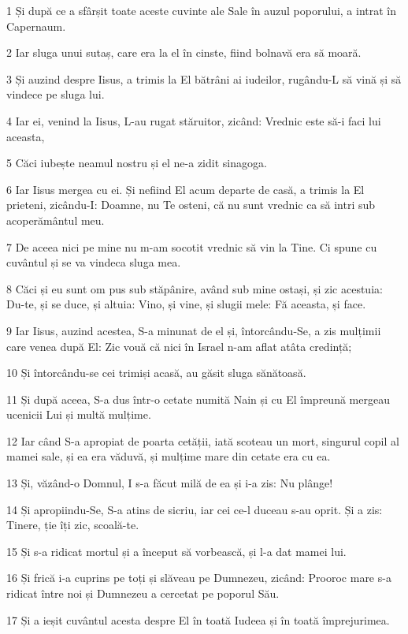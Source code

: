 \par 1 Și după ce a sfârșit toate aceste cuvinte ale Sale în auzul poporului, a intrat în Capernaum.
\par 2 Iar sluga unui sutaș, care era la el în cinste, fiind bolnavă era să moară.
\par 3 Și auzind despre Iisus, a trimis la El bătrâni ai iudeilor, rugându-L să vină și să vindece pe sluga lui.
\par 4 Iar ei, venind la Iisus, L-au rugat stăruitor, zicând: Vrednic este să-i faci lui aceasta,
\par 5 Căci iubește neamul nostru și el ne-a zidit sinagoga.
\par 6 Iar Iisus mergea cu ei. Și nefiind El acum departe de casă, a trimis la El prieteni, zicându-I: Doamne, nu Te osteni, că nu sunt vrednic ca să intri sub acoperământul meu.
\par 7 De aceea nici pe mine nu m-am socotit vrednic să vin la Tine. Ci spune cu cuvântul și se va vindeca sluga mea.
\par 8 Căci și eu sunt om pus sub stăpânire, având sub mine ostași, și zic acestuia: Du-te, și se duce, și altuia: Vino, și vine, și slugii mele: Fă aceasta, și face.
\par 9 Iar Iisus, auzind acestea, S-a minunat de el și, întorcându-Se, a zis mulțimii care venea după El: Zic vouă că nici în Israel n-am aflat atâta credință;
\par 10 Și întorcându-se cei trimiși acasă, au găsit sluga sănătoasă.
\par 11 Și după aceea, S-a dus într-o cetate numită Nain și cu El împreună mergeau ucenicii Lui și multă mulțime.
\par 12 Iar când S-a apropiat de poarta cetății, iată scoteau un mort, singurul copil al mamei sale, și ea era văduvă, și mulțime mare din cetate era cu ea.
\par 13 Și, văzând-o Domnul, I s-a făcut milă de ea și i-a zis: Nu plânge!
\par 14 Și apropiindu-Se, S-a atins de sicriu, iar cei ce-l duceau s-au oprit. Și a zis: Tinere, ție îți zic, scoală-te.
\par 15 Și s-a ridicat mortul și a început să vorbească, și l-a dat mamei lui.
\par 16 Și frică i-a cuprins pe toți și slăveau pe Dumnezeu, zicând: Prooroc mare s-a ridicat între noi și Dumnezeu a cercetat pe poporul Său.
\par 17 Și a ieșit cuvântul acesta despre El în toată Iudeea și în toată împrejurimea.
